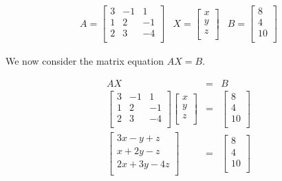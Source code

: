 \[ \begin{array}{ccc} 

A = \left[ \begin{array}{rrr} 3 & -1 & 1  \\ 1 & 2 & -1  \\ 2 & 3 & -4  \\ \end{array} \right]

&

X = \left[ \begin{array}{r}  x \\  y \\  z \\ \end{array} \right]

&

B = \left[ \begin{array}{r}  8 \\  4 \\  10 \\ \end{array} \right]

\end{array} \]

We now consider the matrix equation $AX = B$.

\[ \begin{array}{rcl}

AX & = & B \\ [13pt]
\left[ \begin{array}{rrr} 3 & -1 & 1  \\ 1 & 2 & -1  \\ 2 & 3 & -4  \\ \end{array} \right] \left[ \begin{array}{r}  x \\  y \\  z \\ \end{array} \right] & = & \left[ \begin{array}{r}  8 \\  4 \\  10 \\ \end{array} \right] \\ [13pt]

\left[ \begin{array}{rrr} 3x -y +z  \\ x + 2y  -z  \\ 2x + 3y  -4 z \\ \end{array} \right] & = & \left[ \begin{array}{r}  8 \\  4 \\  10 \\ \end{array} \right] \\ [13pt]

\end{array}\]

